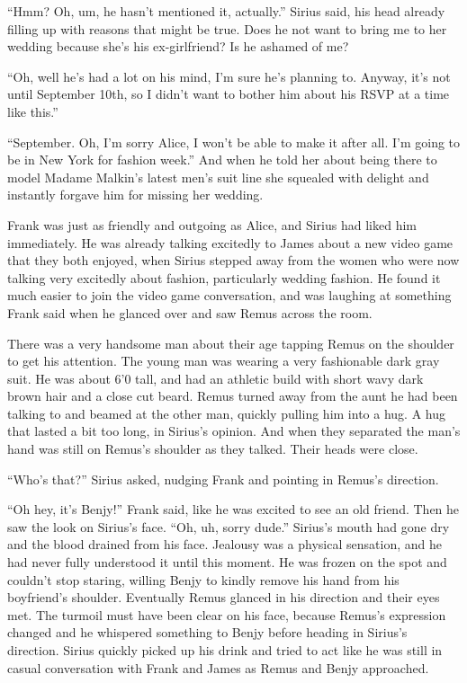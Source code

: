 \documentclass[12pt,twoside,openright]{memoir}
\begin{document}
``Hmm? Oh, um, he hasn't mentioned it, actually.'' Sirius said, his head already filling up with reasons that might be true. Does he not want to bring me to her wedding because she's his ex-girlfriend? Is he ashamed of me? 

``Oh, well he's had a lot on his mind, I'm sure he's planning to. Anyway, it's not until September 10th, so I didn't want to bother him about his RSVP at a time like this.''

``September. Oh, I'm sorry Alice, I won't be able to make it after all. I'm going to be in New York for fashion week.''
And when he told her about being there to model Madame Malkin's latest men's suit line she squealed with delight and instantly forgave him for missing her wedding.

Frank was just as friendly and outgoing as Alice, and Sirius had liked him immediately. He was already talking excitedly to James about a new video game that they both enjoyed, when Sirius stepped away from the women who were now talking very excitedly about fashion, particularly wedding fashion. He found it much easier to join the video game conversation, and was laughing at something Frank said when he glanced over and saw Remus across the room.

There was a very handsome man about their age tapping Remus on the shoulder to get his attention. The young man was wearing a very fashionable dark gray suit. He was about 6'0 tall, and had an athletic build with short wavy dark brown hair and a close cut beard. Remus turned away from the aunt he had been talking to and beamed at the other man, quickly pulling him into a hug. A hug that lasted a bit too long, in Sirius's opinion. And when they separated the man's hand was still on Remus's shoulder as they talked. Their heads were close. 

``Who's that?'' Sirius asked, nudging Frank and pointing in Remus's direction. 

``Oh hey, it's Benjy!'' Frank said, like he was excited to see an old friend. Then he saw the look on Sirius's face. ``Oh, uh, sorry dude.'' Sirius's mouth had gone dry and the blood drained from his face. Jealousy was a physical sensation, and he had never fully understood it until this moment. He was frozen on the spot and couldn't stop staring, willing Benjy to kindly remove his hand from his boyfriend's shoulder. Eventually Remus glanced in his direction and their eyes met. The turmoil must have been clear on his face, because Remus's expression changed and he whispered something to Benjy before heading in Sirius's direction. Sirius quickly picked up his drink and tried to act like he was still in casual conversation with Frank and James as Remus and Benjy approached.
\end{document}
